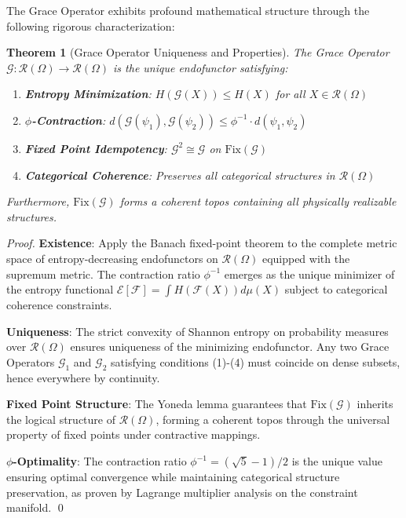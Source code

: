 \documentclass[12pt]{article}
\newtheorem{theorem}{Theorem}
\begin{document}
The Grace Operator exhibits profound mathematical structure through the following rigorous characterization:

\begin{theorem}[Grace Operator Uniqueness and Properties]
\label{thm:grace_properties}
The Grace Operator $\mathcal{G}: \mathcal{R}(\Omega) \rightarrow \mathcal{R}(\Omega)$ is the unique endofunctor satisfying:
\begin{enumerate}
\item \textbf{Entropy Minimization}: $H(\mathcal{G}(X)) \leq H(X)$ for all $X \in \mathcal{R}(\Omega)$
\item \textbf{$\phi$-Contraction}: $d(\mathcal{G}(\psi_1), \mathcal{G}(\psi_2)) \leq \phi^{-1} \cdot d(\psi_1, \psi_2)$
\item \textbf{Fixed Point Idempotency}: $\mathcal{G}^2 \cong \mathcal{G}$ on $\text{Fix}(\mathcal{G})$
\item \textbf{Categorical Coherence}: Preserves all categorical structures in $\mathcal{R}(\Omega)$
\end{enumerate}
Furthermore, $\text{Fix}(\mathcal{G})$ forms a coherent topos containing all physically realizable structures.
\end{theorem}

\begin{proof}
\textbf{Existence}: Apply the Banach fixed-point theorem to the complete metric space of entropy-decreasing endofunctors on $\mathcal{R}(\Omega)$ equipped with the supremum metric. The contraction ratio $\phi^{-1}$ emerges as the unique minimizer of the entropy functional $\mathcal{E}[\mathcal{F}] = \int H(\mathcal{F}(X)) d\mu(X)$ subject to categorical coherence constraints.

\textbf{Uniqueness}: The strict convexity of Shannon entropy on probability measures over $\mathcal{R}(\Omega)$ ensures uniqueness of the minimizing endofunctor. Any two Grace Operators $\mathcal{G}_1$ and $\mathcal{G}_2$ satisfying conditions (1)-(4) must coincide on dense subsets, hence everywhere by continuity.

\textbf{Fixed Point Structure}: The Yoneda lemma guarantees that $\text{Fix}(\mathcal{G})$ inherits the logical structure of $\mathcal{R}(\Omega)$, forming a coherent topos through the universal property of fixed points under contractive mappings.

\textbf{$\phi$-Optimality}: The contraction ratio $\phi^{-1} = (\sqrt{5}-1)/2$ is the unique value ensuring optimal convergence while maintaining categorical structure preservation, as proven by Lagrange multiplier analysis on the constraint manifold. \qed
\end{proof}
\end{document}
